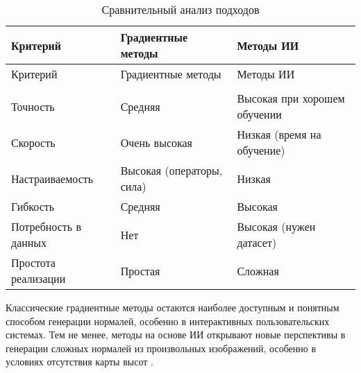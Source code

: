 \begin{xltabular}{\textwidth}{|X|X|X|}
	\caption{Сравнительный анализ подходов\label{compar:table}}	\\ \hline
	Критерий  & \centrow  Градиентные методы & \centrow Методы ИИ \\ \hline
	\endfirsthead
	Критерий & \centrow Градиентные методы & \centrow Методы ИИ \\ \hline 
	\finishhead
	 &  &   \\ \hline 
	Точность & Средняя & Высокая при хорошем обучении  \\ \hline 
	Скорость  & Очень высокая & Низкая (время на обучение) \\ \hline 
	Настраиваемость & Высокая (операторы, сила) & Низкая \\ \hline 
	Гибкость & Средняя & Высокая \\ \hline 
	Потребность в данных & Нет & Высокая (нужен датасет) \\ \hline 
	Простота реализации & Простая & Сложная \\ \hline 
\end{xltabular}

Классические градиентные методы остаются наиболее доступным и понятным способом генерации нормалей, особенно в интерактивных пользовательских системах. Тем не менее, методы на основе ИИ открывают новые перспективы в генерации сложных нормалей из произвольных изображений, особенно в условиях отсутствия карты высот \cite{farinella2020}.